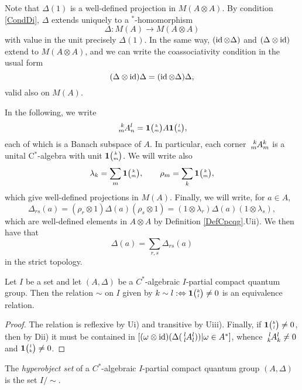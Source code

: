 Note that $\Delta(1)$ is a well-defined projection in $M(A\otimes A)$. By condition \eqref{CondDi}, $\Delta$ extends uniquely to a $^*$-homomorphism \[\Delta: M(A)\rightarrow M(A\otimes A)\] with value in the unit precisely $\Delta(1)$. In the same way, $(\operatorname{id}\otimes \Delta)$ and $(\Delta\otimes \operatorname{id})$ extend to $M(A\otimes A)$, and we can write the coassociativity condition in the usual form \[(\Delta\otimes \operatorname{id})\Delta = (\operatorname{id}\otimes \Delta)\Delta,\] valid also on $M(A)$.

In the following, we write \[\Gr{A}{k}{l}{m}{n} = \UnitC{k}{m}A\UnitC{l}{n},\] each of which is a Banach subspace of $A$. In particular, each corner $\Gr{A}{k}{k}{m}{m}$ is a unital C$^*$-algebra with unit $\mathbf{1}{\tiny {\begin{pmatrix} k\\m\end{pmatrix}}}$. We will write also \[\lambda_k = \sum_{m}\mathbf{1}{\tiny {\begin{pmatrix} k\\m\end{pmatrix}}},\qquad \rho_m = \sum_{k}\mathbf{1}{\tiny {\begin{pmatrix} k\\m\end{pmatrix}}},\] which give well-defined projections in $M(A)$. Finally, we will write, for $a\in A$, \[\Delta_{rs}(a) = (\rho_r\otimes 1)\Delta(a)(\rho_s\otimes 1) = (1\otimes \lambda_r)\Delta(a)(1\otimes \lambda_s),\] which are well-defined elements in $A\otimes A$ by Definition \ref{DefCpcqg}.Uii). We then have that  \[\Delta(a) = \sum_{r,s} \Delta_{rs}(a)\] in the strict topology. 

\begin{Lem}
Let $I$ be a set and let $(A,\Delta)$   be a $C^{*}$-algebraic $I$-partial compact quantum group. Then the relation $\sim$ on $I$ given by $k\sim l :\Leftrightarrow \mathbf{1}{\tiny {\begin{pmatrix} k\\l\end{pmatrix}}}\neq 0$ is an equivalence relation.
\end{Lem}
\begin{proof}
  The relation is reflexive by Ui) and transitive by Uiii). Finally, if $\mathbf{1}{\tiny {\begin{pmatrix} k\\l\end{pmatrix}}}\neq 0$, then by Dii) it must be contained in $[(\omega \otimes \id)(\Delta(\Gr{A}{l}{l}{l}{l})) | \omega \in A^{*}]$, whence $\Gr{A}{l}{l}{k}{k}\neq 0$ and $\mathbf{1}{\tiny {\begin{pmatrix} l\\k\end{pmatrix}}} \neq 0$.
\end{proof}
\begin{Def}
  The \emph{hyperobject set} of a   $C^{*}$-algebraic $I$-partial compact quantum group $(A,\Delta)$ is the set $I/\sim$.
\end{Def}

